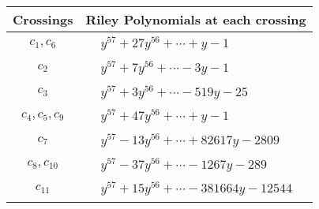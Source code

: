 \documentclass[1p]{elsarticle_modified}
\theoremstyle{definition}
\begin{document}
\begin{tabular}{m{50pt}|m{274pt}}
Crossings & \hspace{64pt}Riley Polynomials at each crossing \\
\hline $$\begin{aligned}c_{1},c_{6}\end{aligned}$$&$\begin{aligned}
&y^{57}+27 y^{56}+\cdots+y-1
\end{aligned}$\\
\hline $$\begin{aligned}c_{2}\end{aligned}$$&$\begin{aligned}
&y^{57}+7 y^{56}+\cdots-3 y-1
\end{aligned}$\\
\hline $$\begin{aligned}c_{3}\end{aligned}$$&$\begin{aligned}
&y^{57}+3 y^{56}+\cdots-519 y-25
\end{aligned}$\\
\hline $$\begin{aligned}c_{4},c_{5},c_{9}\end{aligned}$$&$\begin{aligned}
&y^{57}+47 y^{56}+\cdots+y-1
\end{aligned}$\\
\hline $$\begin{aligned}c_{7}\end{aligned}$$&$\begin{aligned}
&y^{57}-13 y^{56}+\cdots+82617 y-2809
\end{aligned}$\\
\hline $$\begin{aligned}c_{8},c_{10}\end{aligned}$$&$\begin{aligned}
&y^{57}-37 y^{56}+\cdots-1267 y-289
\end{aligned}$\\
\hline $$\begin{aligned}c_{11}\end{aligned}$$&$\begin{aligned}
&y^{57}+15 y^{56}+\cdots-381664 y-12544
\end{aligned}$\\
\hline
\end{tabular}
\vskip 2pc
\end{document}
